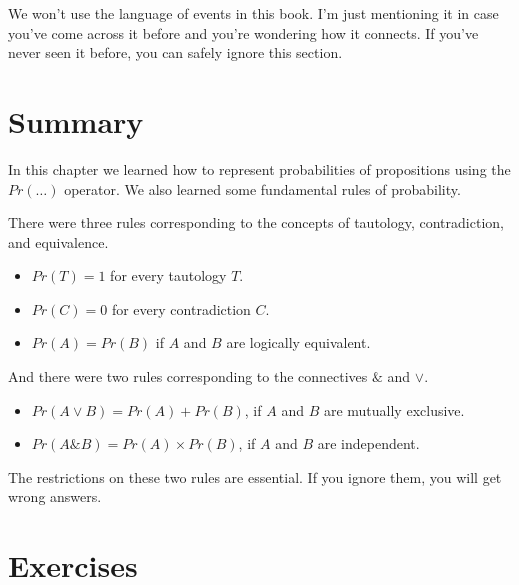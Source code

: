 \documentclass[justified]{tufte-book}
\providecommand{\tightlist}{%
  \setlength{\itemsep}{0pt}\setlength{\parskip}{0pt}}
\renewcommand{\wedge}{\mathbin{\&}}
\newcommand{\p}{Pr}
\theoremstyle{definition}
\theoremstyle{definition}
\theoremstyle{definition}
\theoremstyle{definition}
\theoremstyle{remark}
\begin{document}
We won't use the language of events in this book. I'm just mentioning it in case you've come across it before and you're wondering how it connects. If you've never seen it before, you can safely ignore this section.

\hypertarget{summary-1}{%
\section{Summary}\label{summary-1}}

In this chapter we learned how to represent probabilities of propositions using the \(Pr(\ldots)\) operator. We also learned some fundamental rules of probability.

There were three rules corresponding to the concepts of tautology, contradiction, and equivalence.

\begin{itemize}
\tightlist
\item
  \(\p(T) = 1\) for every tautology \(T\).
\item
  \(\p(C) = 0\) for every contradiction \(C\).
\item
  \(\p(A) = \p(B)\) if \(A\) and \(B\) are logically equivalent.
\end{itemize}

And there were two rules corresponding to the connectives \(\wedge\) and \(\vee\).

\begin{itemize}
\tightlist
\item
  \(Pr(A \vee B) = Pr(A) + Pr(B)\), if \(A\) and \(B\) are mutually exclusive.
\item
  \(Pr(A \wedge B) = Pr(A) \times Pr(B)\), if \(A\) and \(B\) are independent.
\end{itemize}

The restrictions on these two rules are essential. If you ignore them, you will get wrong answers.

\hypertarget{exercises-4}{%
\section*{Exercises}\label{exercises-4}}
\end{document}
